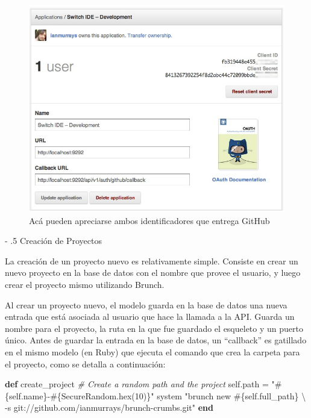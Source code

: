 \documentclass[12pt,titlepage,]{article}
\makeatletter
\newenvironment{Shaded}{}{}
\newcommand{\KeywordTok}[1]{\textcolor[rgb]{0.00,0.44,0.13}{\textbf{{#1}}}}
\newcommand{\DataTypeTok}[1]{\textcolor[rgb]{0.56,0.13,0.00}{{#1}}}
\newcommand{\DecValTok}[1]{\textcolor[rgb]{0.25,0.63,0.44}{{#1}}}
\newcommand{\StringTok}[1]{\textcolor[rgb]{0.25,0.44,0.63}{{#1}}}
\newcommand{\CommentTok}[1]{\textcolor[rgb]{0.38,0.63,0.69}{\textit{{#1}}}}
\newcommand{\OtherTok}[1]{\textcolor[rgb]{0.00,0.44,0.13}{{#1}}}
\newcommand{\NormalTok}[1]{{#1}}
\def\maxwidth{\ifdim\Gin@nat@width>\linewidth\linewidth
\else\Gin@nat@width\fi}
\let\Oldincludegraphics\includegraphics
\renewcommand{\includegraphics}[1]{\Oldincludegraphics[width=\maxwidth]{#1}}
\renewcommand\paragraph{%
   \@startsection{paragraph}{4}{0mm}%
      {-\baselineskip}%
      {.5\baselineskip}%
      {\normalfont\normalsize\bfseries}}
\makeatother
\begin{document}
\begin{figure}[htbp]
\centering
\includegraphics{figures/oauth-app.png}
\caption{Acá pueden apreciarse ambos identificadores que entrega GitHub
\label{figures:oauth-app}}
\end{figure}

\paragraph{Creación de Proyectos}

La creación de un proyecto nuevo es relativamente simple. Consiste en
crear un nuevo proyecto en la base de datos con el nombre que provee el
usuario, y luego crear el proyecto mismo utilizando Brunch.

Al crear un proyecto nuevo, el modelo guarda en la base de datos una
nueva entrada que está asociada al usuario que hace la llamada a la API.
Guarda un nombre para el proyecto, la ruta en la que fue guardado el
esqueleto y un puerto único. Antes de guardar la entrada en la base de
datos, un ``callback'' es gatillado en el mismo modelo (en Ruby) que
ejecuta el comando que crea la carpeta para el proyecto, como se detalla
a continuación:

\begin{Shaded}
\begin{Highlighting}[]
\KeywordTok{def} \NormalTok{create_project}
  \CommentTok{# Create a random path and the project}
  \DecValTok{self}\NormalTok{.path = }\StringTok{"}\OtherTok{#\{}\DecValTok{self}\NormalTok{.name}\OtherTok{\}}\StringTok{-}\OtherTok{#\{}\DataTypeTok{SecureRandom}\NormalTok{.hex(}\DecValTok{10}\NormalTok{)}\OtherTok{\}}\StringTok{"}
  \NormalTok{system }\StringTok{"brunch new }\OtherTok{#\{}\DecValTok{self}\NormalTok{.full_path}\OtherTok{\}}\StringTok{ \textbackslash{}}
\StringTok{          -s git://github.com/ianmurrays/brunch-crumbs.git"}
\KeywordTok{end}
\end{Highlighting}
\end{Shaded}
\end{document}
